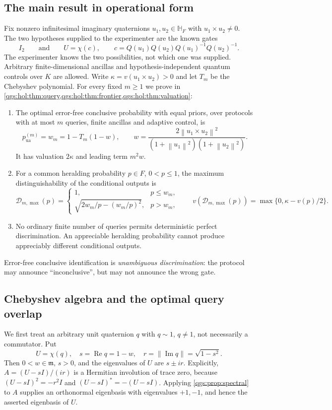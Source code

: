\documentclass[11pt,oneside]{article}
\numberwithin{equation}{section}
\theoremstyle{plain}
\theoremstyle{definition}
\theoremstyle{remark}
\newcommand{\HF}{\mathbb H_F}
\newcommand{\mm}{\mathfrak m}
\newcommand{\TD}{\mathcal D}
\DeclareMathOperator{\Rea}{Re}
\DeclareMathOperator{\Ima}{Im}
\newcommand{\norm}[1]{\left\|#1\right\|}
\begin{document}
\subsection{The main result in operational form}\label{qgs:hol:sec:main}
Fix nonzero infinitesimal imaginary quaternions $u_1,u_2\in\HF$ with $u_1\times u_2\neq0$. The two hypotheses supplied to the experimenter are the known gates
\[
 I_2\qquad\text{and}\qquad U=\chi(c),\qquad c=Q(u_1)Q(u_2)Q(u_1)^{-1}Q(u_2)^{-1}.
\]
The experimenter knows the two possibilities, not which one was supplied. Arbitrary finite-dimensional ancillas and hypothesis-independent quantum controls over $K$ are allowed. Write $\kappa=v(u_1\times u_2)>0$ and let $T_m$ be the Chebyshev polynomial. For every fixed $m\ge1$ we prove in \cref{qgs:hol:thm:query,qgs:hol:thm:frontier,qgs:hol:thm:valuation}:
\begin{enumerate}
\item The optimal error-free conclusive probability with equal priors, over protocols with at most $m$ queries, finite ancillas and adaptive control, is
\[
 p_{\mathrm{ua}}^{(m)}=w_m=1-T_m(1-w),\qquad
 w=\frac{2\norm{u_1\times u_2}^2}{(1+\norm{u_1}^2)(1+\norm{u_2}^2)}.
\]
It has valuation $2\kappa$ and leading term $m^2w$.
\item For a common heralding probability $p\in F$, $0<p\leq1$, the maximum distinguishability of the conditional outputs is
\begin{equation}\label{qgs:hol:eq:intro-frontier}
 \TD_{m,\max}(p)=
 \begin{cases}
 1,&p\leq w_m,\\
 \sqrt{2w_m/p-(w_m/p)^2},&p>w_m,
 \end{cases}
 \qquad
 v(\TD_{m,\max}(p))=\max\{0,\kappa-v(p)/2\}.
\end{equation}
\item No ordinary finite number of queries permits deterministic perfect discrimination. An appreciable heralding probability cannot produce appreciably different conditional outputs.
\end{enumerate}
Error-free conclusive identification is \emph{unambiguous discrimination}: the protocol may announce ``inconclusive'', but may not announce the wrong gate.

\subsection{Chebyshev algebra and the optimal query overlap}
We first treat an arbitrary unit quaternion $q$ with $q\sim1$, $q\neq1$, not necessarily a commutator. Put
\[
 U=\chi(q),\quad s=\Rea q=1-w,\quad
 r=\norm{\Ima q}=\sqrt{1-s^2}.
\]
Then $0<w\in\mm$, $s>0$, and the eigenvalues of $U$ are $s\pm ir$. Explicitly, $A=(U-sI)/(ir)$ is a Hermitian involution of trace zero, because $(U-sI)^2=-r^2I$ and $(U-sI)^*=-(U-sI)$. Applying \cref{qgs:prop:spectral} to $A$ supplies an orthonormal eigenbasis with eigenvalues $+1,-1$, and hence the asserted eigenbasis of $U$.
\end{document}
